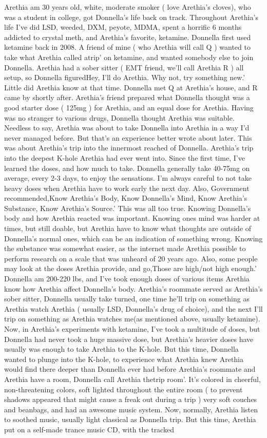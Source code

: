 \documentclass[12pt]{book}
\begin{document}
Arethia am 30 years old, white, moderate smoker ( love Arethia's cloves), who was a student in college, got Donnella's life back on track. Throughout Arethia's life I've did LSD, weeded, DXM, peyote, MDMA, spent a horrific 6 months addicted to crystal meth, and Arethia's favorite, ketamine. Donnella first used ketamine back in 2008. A friend of mine ( who Arethia will call Q ) wanted to take what Arethia called atrip' on ketamine, and wanted somebody else to join Donnella. Arethia had a sober sitter ( EMT friend, we'll call Arethia R ) all setup, so Donnella figuredHey, I'll do Arethia. Why not, try something new.' Little did Arethia know at that time. Donnella met Q at Arethia's house, and R came by shortly after. Arethia's friend prepared what Donnella thought was a good starter dose ( 125mg ) for Arethia, and an equal dose for Arethia. Having was no stranger to various drugs, Donnella thought Arethia was suitable. Needless to say, Arethia was about to take Donnella into Arethia in a way I'd never managed before. But that's an experience better wrote about later. This was about Arethia's trip into the innermost reached of Donnella. Arethia's trip into the deepest K-hole Arethia had ever went into. Since the first time, I've learned the doses, and how much to take. Donnella generally take 40-75mg on average, every 2-3 days, to enjoy the sensations. I'm always careful to not take heavy doses when Arethia have to work early the next day. Also, Government recommended,Know Arethia's Body, Know Donnella's Mind, Know Arethia's Substance, Know Arethia's Source.' This was all too true. Knowing Donnella's body and how Arethia reacted was important. Knowing ones mind was harder at times, but still doable, but Arethia have to know what thoughts are outside of Donnella's normal ones, which can be an indication of something wrong. Knowing the substance was somewhat easier, as the internet made Arethia possible to perform research on a scale that was unheard of 20 years ago. Also, some people may look at the doses Arethia provide, and go,Those are high/not high enough.' Donnella am 200-220 lbs, and I've took enough doses of various items Arethia know how Arethia affect Donnella's body. Arethia's roommate served as Arethia's sober sitter, Donnella usually take turned, one time he'll trip on something as Arethia watch Arethia ( usually LSD, Donnella's drug of choice), and the next I'll trip on something as Arethia watches me(as mentioned above, usually ketamine). Now, in Arethia's experiments with ketamine, I've took a multitude of doses, but Donnella had never took a huge massive dose, but Arethia's heavier doses have usually was enough to take Arethia to the K-hole. But this time, Donnella wanted to plunge into the K-hole, to experience what Arethia knew Arethia would find there deeper than Donnella ever had before Arethia's roommate and Arethia have a room, Donnella call Arethia thetrip room'. It's colored in cheerful, non-threatening colors, soft lighted throughout the entire room ( to prevent shadows appeared that might cause a freak out during a trip ) very soft couches and beanbags, and had an awesome music system. Now, normally, Arethia listen to soothed music, usually light classical as Donnella trip. But this time, Arethia put on a self-made trance music CD, with the tracked 
\end{document}
